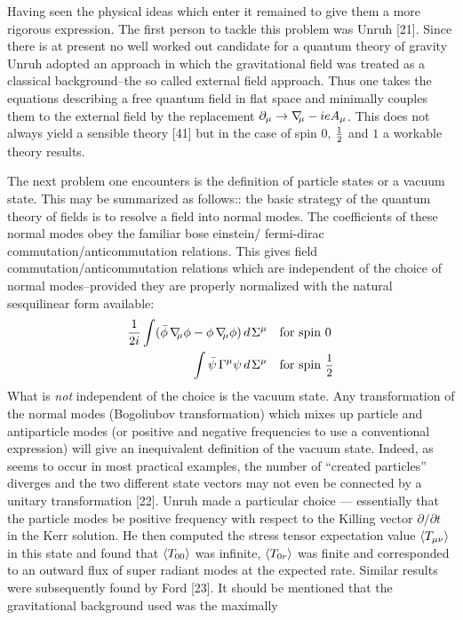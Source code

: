 Having seen the physical ideas which enter it remained to give them a
more rigorous expression. The first person to tackle this problem was
Unruh [21]. Since there is at present no well worked out candidate for a quantum theory
of gravity Unruh adopted an approach in which the gravitational field was treated as
a classical background--the so called external field approach. Thus one takes
the equations describing a free quantum field in flat space and minimally
couples them to the external field by the replacement $\partial_\mu \to \grad_{\!\mu} - ieA_\mu$.
This does not always yield a sensible theory [41] but in the case of spin 0, $\small{\frac{1}{2}}$ and $1$ a workable
theory results.

The next problem one encounters is the definition of particle states or a
vacuum state. This may be summarized as follows:: the basic strategy of the quantum theory of fields 
is to resolve a field into normal modes. The coefficients
of these normal modes obey the familiar bose einstein/ fermi-dirac commutation/anticommutation
relations. This gives field commutation/anticommutation relations which are independent
of the choice of normal modes--provided they are properly normalized with the
natural sesquilinear form available:
\begin{align}
\frac{1}{2i} \int (\bar\phi\grad_{\!\mu}\phi - \phi\grad_{\!\mu}\phi) \,d\mskip 2mu\Sigma^\mu \quad & \text{for spin 0}\\
\int \bar\psi\GG^\mu\psi \,d\mskip 2mu\Sigma^\mu \quad & \text{for spin \small$\half$}
\end{align}
What is {\it not} independent of the choice is the vacuum state. Any transformation
of the normal modes (Bogoliubov transformation) which mixes up particle and
antiparticle modes (or positive and negative frequencies to use a conventional expression)
will give an inequivalent definition of the vacuum state. Indeed, as
seems to occur in most practical examples, the number of ``created particles'' diverges and
the two different state vectors may not even be connected by a unitary transformation [22].
Unruh made a particular choice --- essentially that the particle modes be positive
frequency with respect to the Killing vector $\partial/\partial t$ in the Kerr solution.
He then computed the stress tensor expectation value $\langle T_{\mu\nu} \rangle$ in this state and found
that $\langle T_{00} \rangle$ was infinite, $\langle T_{0r} \rangle$ was finite and corresponded to an outward flux of
super radiant modes at the expected rate. Similar results were subsequently found by Ford [23].
It should be mentioned that the gravitational background used was the maximally
